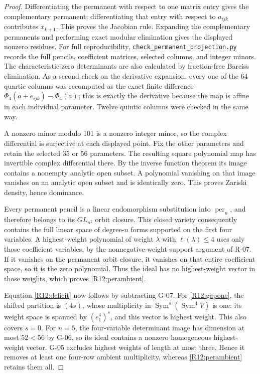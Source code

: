 \documentclass[11pt,a4paper]{article}
\theoremstyle{definition}\newtheorem{definition}{Definition}
\begin{document}
\begin{proof}
Differentiating the permanent with respect to one matrix entry
gives the complementary permanent; differentiating that entry
with respect to $a_{ijk}$ contributes $x_{k+1}$. This proves the
Jacobian rule. Expanding the complementary permanents and
performing exact modular elimination gives the displayed
nonzero residues. For full reproducibility,
\texttt{check\_permanent\_projection.py} records the full pencils,
coefficient matrices, selected columns, and integer minors.
The characteristic-zero determinants are also calculated by
fraction-free Bareiss elimination. As a second check on the
derivative expansion, every one of the 64 quartic columns was
recomputed as the exact finite difference
$\Phi_4(a+e_{ijk})-\Phi_4(a)$; this is exactly the derivative
because the map is affine in each individual parameter.
Twelve quintic columns were checked in the same way.

A nonzero minor modulo 101 is a nonzero integer minor, so the
complex differential is surjective at each displayed point.
Fix the other parameters and retain the selected 35 or 56
parameters. The resulting square polynomial map has invertible
complex differential there. By the inverse function theorem its
image contains a nonempty analytic open subset. A polynomial
vanishing on that image vanishes on an analytic open subset and
is identically zero. This proves Zariski density, hence dominance.

Every permanent pencil is a linear endomorphism substitution
into $\operatorname{per}_n$, and therefore belongs to its
$GL_{n^2}$ orbit closure. This closed variety consequently
contains the full linear space of degree-$n$ forms supported on
the first four variables. A highest-weight polynomial of weight
$\lambda$ with $\ell(\lambda)\leq4$ uses only those coefficient
variables, by the nonnegative-weight support argument of R-07.
If it vanishes on the permanent orbit closure, it vanishes on
that entire coefficient space, so it is the zero polynomial.
Thus the ideal has no highest-weight vector in those weights,
which proves \eqref{R12:perambient}.

Equation \eqref{R12:deficit} now follows by subtracting G-07.
For \eqref{R12:gapone}, the shifted partition is $(4s)$, whose
multiplicity in $\operatorname{Sym}^s(\operatorname{Sym}^4V)$ is
one: its weight space is spanned by $(e_1^4)^s$, and this vector
is highest weight. This also covers $s=0$.
For $n=5$, the four-variable determinant image has dimension at
most $52<56$ by G-06, so its ideal contains a nonzero homogeneous
highest-weight vector. G-05 excludes highest weights of length
at most three. Hence it removes at least one four-row ambient
multiplicity, whereas \eqref{R12:perambient} retains them all.
\end{proof}
\end{document}
